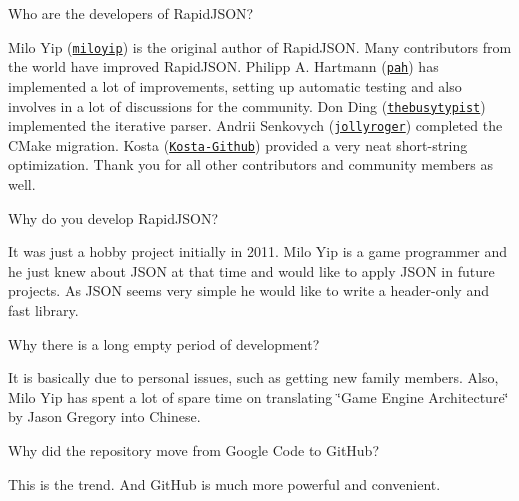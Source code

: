 \begin{DoxyEnumerate}
\item Who are the developers of Rapid\+J\+S\+ON?

Milo Yip (\href{https://github.com/miloyip}{\tt miloyip}) is the original author of Rapid\+J\+S\+ON. Many contributors from the world have improved Rapid\+J\+S\+ON. Philipp A. Hartmann (\href{https://github.com/pah}{\tt pah}) has implemented a lot of improvements, setting up automatic testing and also involves in a lot of discussions for the community. Don Ding (\href{https://github.com/thebusytypist}{\tt thebusytypist}) implemented the iterative parser. Andrii Senkovych (\href{https://github.com/jollyroger}{\tt jollyroger}) completed the C\+Make migration. Kosta (\href{https://github.com/Kosta-Github}{\tt Kosta-\/\+Github}) provided a very neat short-\/string optimization. Thank you for all other contributors and community members as well.
\item Why do you develop Rapid\+J\+S\+ON?

It was just a hobby project initially in 2011. Milo Yip is a game programmer and he just knew about J\+S\+ON at that time and would like to apply J\+S\+ON in future projects. As J\+S\+ON seems very simple he would like to write a header-\/only and fast library.
\item Why there is a long empty period of development?

It is basically due to personal issues, such as getting new family members. Also, Milo Yip has spent a lot of spare time on translating \char`\"{}\+Game Engine Architecture\char`\"{} by Jason Gregory into Chinese.
\item Why did the repository move from Google Code to Git\+Hub?

This is the trend. And Git\+Hub is much more powerful and convenient. 
\end{DoxyEnumerate}